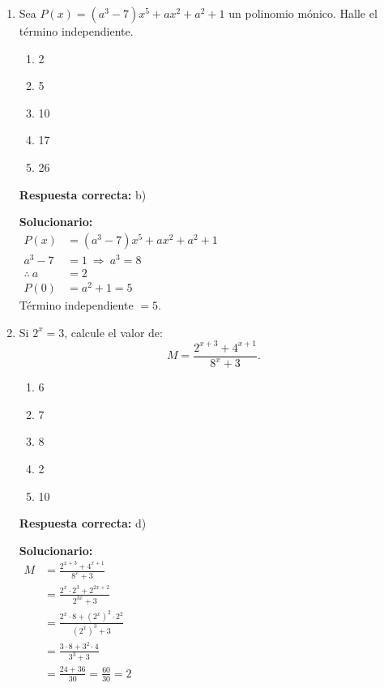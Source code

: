 \begin{enumerate}
	
	\item Sea $P(x)=(a^3-7)x^5+ax^2+a^2+1$ un polinomio mónico. Halle el término independiente.
	
	\begin{enumerate}[label=\alph*)]
		\item 2
		\item 5
		\item 10
		\item 17
		\item 26
	\end{enumerate}
	
	\textbf{Respuesta correcta:} b)
	
	\vspace{2mm}
	\textbf{Solucionario:}\\
	
	$
	\begin{aligned}
		P(x) &= (a^3-7)x^5+ax^2+a^2+1\\
		a^3-7 &= 1 \ \Rightarrow\ a^3=8\\
		\therefore\ a &= 2\\
		P(0) &= a^2+1 = 5
	\end{aligned}
	$
	\\
	Término independiente $=5$.
	
	
	\item Si $2^x=3$, calcule el valor de:
	\[
	M=\frac{2^{x+3}+4^{x+1}}{8^x+3}.
	\]
	
	\begin{enumerate}[label=\alph*)]
		\item 6
		\item 7
		\item 8
		\item 2
		\item 10
	\end{enumerate}
	
	\textbf{Respuesta correcta:} d)
	
	\vspace{2mm}
	\textbf{Solucionario:}\\
	
	$
	\begin{aligned}
		M &= \frac{2^{x+3}+4^{x+1}}{8^x+3}\\
		&= \frac{2^x\cdot 2^3 + 2^{2x+2}}{2^{3x}+3}\\
		&= \frac{2^x\cdot 8 + (2^x)^2\cdot 2^2}{(2^x)^3+3}\\
		&= \frac{3\cdot 8 + 3^2\cdot 4}{3^3+3}\\
		&= \frac{24+36}{30}=\frac{60}{30}=2
	\end{aligned}
	$
	

\end{enumerate}
